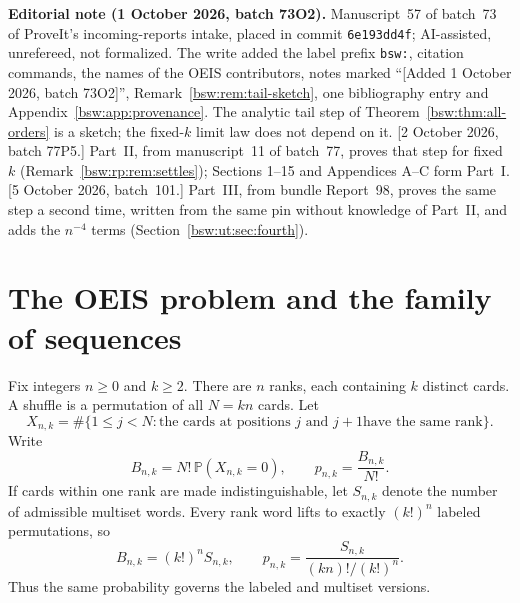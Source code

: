 \documentclass[11pt,letterpaper]{article}
\theoremstyle{definition}
\theoremstyle{remark}
\newcommand{\PP}{\mathbb P}
\begin{document}
\newpage
{\small\textbf{Editorial note (1 October 2026, batch 73O2).}
Manuscript~57 of batch~73 of ProveIt's incoming-reports intake, placed in
commit \texttt{6e193dd4f}; AI-assisted, unrefereed, not formalized.  The
write added the label prefix \texttt{bsw:}, citation commands, the names of
the OEIS contributors, notes marked ``[Added 1 October 2026, batch 73O2]'',
Remark~\ref{bsw:rem:tail-sketch}, one bibliography entry and
Appendix~\ref{bsw:app:provenance}.  The analytic tail step of
Theorem~\ref{bsw:thm:all-orders} is a sketch; the fixed-$k$ limit law does
not depend on it.
[2 October 2026, batch 77P5.]  Part~II, from manuscript~11 of batch~77,
proves that step for fixed $k$ (Remark~\ref{bsw:rp:rem:settles}); Sections
1--15 and Appendices A--C form Part~I.
[5 October 2026, batch~101.]  Part~III, from bundle Report~98, proves the
same step a second time, written from the same pin without knowledge of
Part~II, and adds the $n^{-4}$ terms (Section~\ref{bsw:ut:sec:fourth}).\par}
\vspace{-0.5em}
\setcounter{tocdepth}{1}
\tableofcontents
\newpage

\section{The OEIS problem and the family of sequences}

Fix integers $n\ge0$ and $k\ge2$.  There are $n$ ranks, each containing $k$
distinct cards.  A shuffle is a permutation of all $N=kn$ cards.  Let
\begin{equation}\label{bsw:eq:Xdef}
 X_{n,k}=\#\{1\le j<N:\text{the cards at positions $j$ and $j+1$
have the same rank}\}.
\end{equation}
Write
\begin{equation}\label{bsw:eq:defB}
 B_{n,k}=N!\,\PP(X_{n,k}=0),
 \qquad p_{n,k}=\frac{B_{n,k}}{N!}.
\end{equation}
If cards within one rank are made indistinguishable, let $S_{n,k}$ denote the
number of admissible multiset words.  Every rank word lifts to exactly
$(k!)^n$ labeled permutations, so
\begin{equation}\label{bsw:eq:labeled-multiset}
 B_{n,k}=(k!)^n S_{n,k},
 \qquad
 p_{n,k}=\frac{S_{n,k}}{(kn)!/(k!)^n}.
\end{equation}
Thus the same probability governs the labeled and multiset versions.
\end{document}
